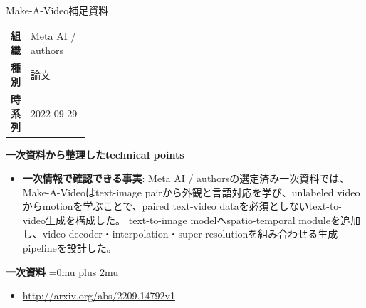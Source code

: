 \begin{technicalnote}{Make-A-Video}{補足資料}
\begingroup
\begin{tabularx}{\linewidth}{@{}>{\bfseries}p{0.22\linewidth}X@{}}
組織 & Meta AI / authors \\
種別 & 論文 \\
時系列 & 2022-09-29 \\
\end{tabularx}
\smallskip
{\bfseries 一次資料から整理したtechnical points}
\begin{itemize}[leftmargin=1.5em,itemsep=0.35em]
\item \textbf{一次情報で確認できる事実}: Meta AI / authorsの選定済み一次資料では、Make-A-Videoはtext-image pairから外観と言語対応を学び、unlabeled videoからmotionを学ぶことで、paired text-video dataを必須としないtext-to-video生成を構成した。 text-to-image modelへspatio-temporal moduleを追加し、video decoder・interpolation・super-resolutionを組み合わせる生成pipelineを設計した。
\end{itemize}
\begin{minipage}{\linewidth}
\begin{samepage}
{\bfseries 一次資料}
\begingroup\sloppy
\Urlmuskip=0mu plus 2mu\relax
\begin{itemize}[leftmargin=1.5em,itemsep=0.25em]
\item {\scriptsize\url{http://arxiv.org/abs/2209.14792v1}}
\end{itemize}
\endgroup
\end{samepage}
\end{minipage}
\endgroup
\end{technicalnote}
\medskip

